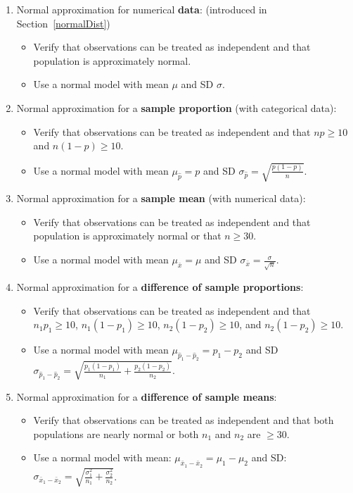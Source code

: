 \begin{enumerate}

\item Normal approximation for numerical \textbf{data}:  (introduced in Section~\ref{normalDist})
\begin{itemize}
\item Verify that observations can be treated as independent and that population is approximately normal.
\item Use a normal model with mean $\mu$ and SD $\sigma$.
\end{itemize}

\item Normal approximation for a \textbf{sample proportion} (with categorical data):  
\begin{itemize}
\item Verify that observations can be treated as independent and that $np\ge 10$ and $n(1-p)\ge 10$.
\item Use a normal model with mean $\mu_{\hat{p}} = p$ and SD $\sigma_{\hat{p}} = \sqrt{\frac{p(1-p)}{n}}$.
\end{itemize}


\item Normal approximation for a \textbf{sample mean} (with numerical data): 
\begin{itemize} 
\item Verify that observations can be treated as independent and that population is approximately normal or that $n\ge 30$.
\item Use a normal model with mean $\mu_{\bar{x}}=\mu$ and SD $\sigma_{\bar{x}}=\frac{\sigma}{\sqrt{n}}$.
\end{itemize}

\item  Normal approximation for a \textbf{difference of sample proportions}:
\begin{itemize}
\item Verify that observations can be treated as independent and that  \\$n_1p_1\ge 10$, $n_1(1-p_1)\ge 10$, $n_2(1-p_2)\ge 10$, and $n_2(1-p_2)\ge 10$.
\item Use a normal model with mean $\mu_{\hat{p}_1-\hat{p}_2} = p_1-p_2$ and SD $\sigma_{\hat{p}_1-\hat{p}_2}=  \sqrt{\frac{p_1(1-p_1)}{n_1} + \frac{p_2(1-p_2)}{n_2}}$.
\end{itemize}


\item  Normal approximation for a \textbf{difference of sample means}:
\begin{itemize}
\item Verify that observations can be treated as independent and that both populations are nearly normal or both $n_1$ and $n_2$ are $\ge 30$.  
\item Use a normal model with mean: $\mu_{\bar{x}_1 - \bar{x}_2} = \mu_1 - \mu_2$ and SD: $\sigma_{\bar{x}_1 - \bar{x}_2}= \sqrt{\frac{\sigma_1^2}{n_1} + \frac{\sigma_2^2}{n_2}}$.
\end{itemize}

\end{enumerate}


